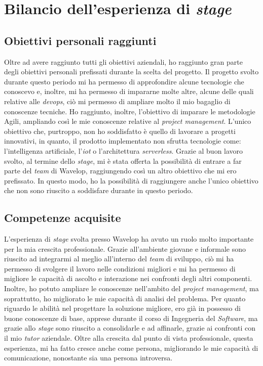\section{Bilancio dell'esperienza di \emph{stage}}

\subsection{Obiettivi personali raggiunti}
Oltre ad avere raggiunto tutti gli obiettivi aziendali, ho raggiunto gran parte degli obiettivi personali prefissati durante la scelta del progetto.
Il progetto svolto durante questo periodo mi ha permesso di approfondire alcune tecnologie che conoscevo e, inoltre, mi ha permesso di impararne molte altre, alcune delle quali relative alle \emph{devops}, ciò mi permesso di ampliare molto il mio bagaglio di conoscenze tecniche. 
Ho raggiunto, inoltre, l'obiettivo di imparare le metodologie Agili, ampliando così le mie conoscenze relative al \emph{project management}.
L'unico obiettivo che, purtroppo, non ho soddisfatto è quello di lavorare a progetti innovativi, in quanto, il prodotto implementato non sfrutta tecnologie come: l'intelligenza artificiale, l'\emph{\acrlong{iot}} o l'architettura \emph{serverless}.
Grazie al buon lavoro svolto, al termine dello \emph{stage}, mi è stata offerta la possibilità di entrare a far parte del \emph{team} di Wavelop, raggiungendo così un altro obiettivo che mi ero prefissato.
In questo modo, ho la possibilità di raggiungere anche l'unico obiettivo che non sono riuscito a soddisfare durante in questo periodo.

\subsection{Competenze acquisite}
L'esperienza di \emph{stage} svolta presso Wavelop ha avuto un ruolo molto importante per la mia crescita professionale.
Grazie all'ambiente giovane e informale sono riuscito ad integrarmi al meglio all'interno del \emph{team} di sviluppo, ciò mi ha permesso di svolgere il lavoro nelle condizioni migliori e mi ha permesso di migliore le capacità di ascolto e interazione nei confronti degli altri componenti.
Inoltre, ho potuto ampliare le conoscenze nell'ambito del \emph{project management}, ma soprattutto, ho migliorato le mie capacità di analisi del problema.
Per quanto riguardo le abilità nel progettare la soluzione migliore, ero già in possesso di buone conoscenze di base, apprese durante il corso di Ingegneria del \emph{Software}, ma grazie allo \emph{stage} sono riuscito a consolidarle e ad affinarle, grazie ai confronti con il mio \emph{tutor} aziendale.
Oltre alla crescita dal punto di vista professionale, questa esperienza, mi ha fatto cresce anche come persona, migliorando le mie capacità di comunicazione, nonostante sia una persona introversa.

